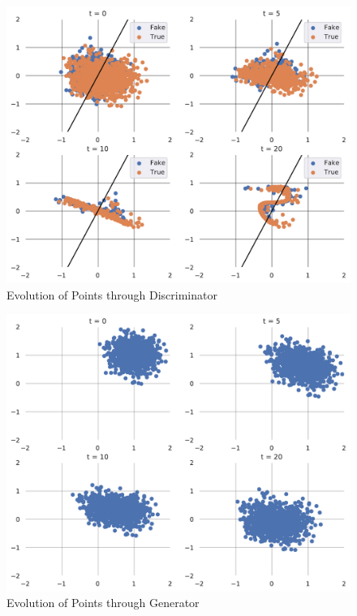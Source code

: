 \begin{figure}
    \centering
    \includegraphics[width = 13 cm]{Evo_5.pdf}
    \caption{Evolution of Points through Discriminator}
    \label{fig:evo_dis_gau}
\end{figure}
\begin{figure}
    \centering
    \includegraphics[width = 13 cm]{Evo_6.pdf}
    \caption{Evolution of Points through Generator}
    \label{fig:evo_gen_gau}
\end{figure}


